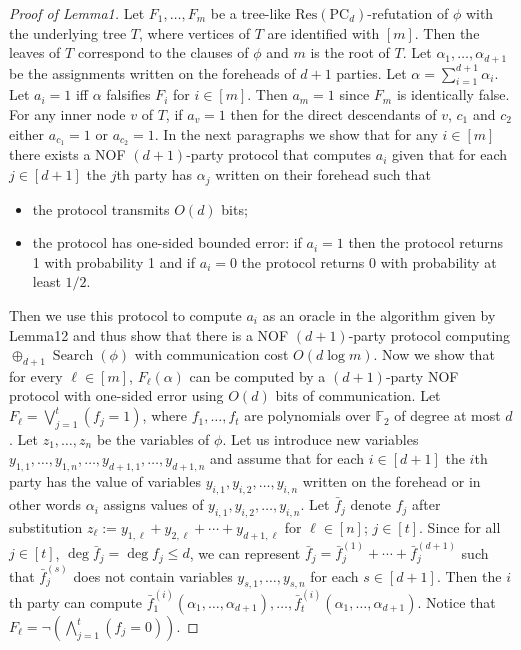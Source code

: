 \begin{proof}[Proof of Lemma1]
Let $F_1,\ldots,F_m$ be a tree-like $\mathrm{Res}(\mathrm{PC}_d)$-refutation of $\phi$ with the underlying tree $T$, where vertices of $T$ are identified with $[m]$. Then the leaves of $T$ correspond to the clauses of $\phi$ and $m$ is the root of $T$.
Let $\alpha_1,\ldots,\alpha_{d+1}$ be the assignments written on the foreheads of $d+1$ parties. Let $\alpha=\sum_{i=1}^{d+1}\alpha_i$. Let $a_i=1$ iff $\alpha$ falsifies $F_i$ for $i\in[m]$. Then $a_m=1$ since $F_m$ is identically false. For any inner node $v$ of $T$, if $a_v=1$ then for the direct descendants of $v$, $c_1$ and $c_2$ either $a_{c_1}=1$ or $a_{c_2}=1$. In the next paragraphs we show that for any $i\in[m]$ there exists a NOF $(d+1)$-party protocol that computes $a_i$ given that for each $j\in[d+1]$ the $j$th party has $\alpha_j$ written on their forehead such that
\begin{itemize}
\item the protocol transmits $O(d)$ bits;
\item the protocol has one-sided bounded error: if $a_i=1$ then the protocol returns 1 with probability 1 and if $a_i=0$ the protocol returns 0 with probability at least $1/2$.
\end{itemize}
Then we use this protocol to compute $a_i$ as an oracle in the algorithm given by Lemma12 and thus show that there is a NOF $(d+1)$-party protocol computing $\oplus_{d+1}\operatorname{Search}(\phi)$ with communication cost $O(d\log m)$.
Now we show that for every $\ell\in[m]$, $F_\ell(\alpha)$ can be computed by a $(d+1)$-party NOF protocol with one-sided error using $O(d)$ bits of communication. Let $F_\ell=\bigvee_{j=1}^t(f_j=1)$, where $f_1,\ldots,f_t$ are polynomials over $\mathbb F_2$ of degree at most $d$. Let $z_1,\ldots,z_n$ be the variables of $\phi$. Let us introduce new variables $y_{1,1},\ldots,y_{1,n},\ldots,y_{d+1,1},\ldots,y_{d+1,n}$ and assume that for each $i\in[d+1]$ the $i$th party has the value of variables $y_{i,1},y_{i,2},\ldots,y_{i,n}$ written on the forehead or in other words $\alpha_i$ assigns values of $y_{i,1},y_{i,2},\ldots,y_{i,n}$. Let $\bar f_j$ denote $f_j$ after substitution $z_\ell:=y_{1,\ell}+y_{2,\ell}+\cdots+y_{d+1,\ell}$ for $\ell\in[n]$; $j\in[t]$. Since for all $j\in[t]$, $\deg\bar f_j=\deg f_j\le d$, we can represent $\bar f_j=\bar f_j^{(1)}+\cdots+\bar f_j^{(d+1)}$ such that $\bar f_j^{(s)}$ does not contain variables $y_{s,1},\ldots,y_{s,n}$ for each $s\in[d+1]$. Then the $i$th party can compute $\bar f_1^{(i)}(\alpha_1,\ldots,\alpha_{d+1}),\ldots,\bar f_t^{(i)}(\alpha_1,\ldots,\alpha_{d+1})$. Notice that $F_\ell=\neg(\bigwedge_{j=1}^t(f_j=0))$.

\end{proof}
